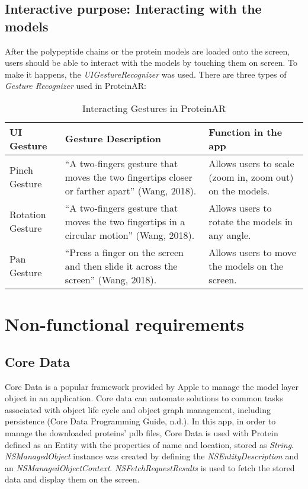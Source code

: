 \subsection{Interactive purpose: Interacting with the models}
After the polypeptide chains or the protein models are loaded onto the screen, users should be able to interact with the models by touching them on screen. To make it happens, the \emph{UIGestureRecognizer} was used. There are three types of \emph{Gesture Recognizer} used in ProteinAR:

\begin{table}[h!]
\centering
\begin{tabularx}{\textwidth} {
  | >{\raggedright\arraybackslash}X 
  | >{\raggedright\arraybackslash}X 
  | >{\raggedright\arraybackslash}X | }
\hline
UI Gesture & Gesture Description & Function in the app \\
\hline
\hline
Pinch Gesture & “A two-fingers gesture that moves the two fingertips closer or farther apart” (Wang, 2018). & Allows users to scale (zoom in, zoom out) on the models. \\
\hline
Rotation Gesture & “A two-fingers gesture that moves the two fingertips in a circular motion” (Wang, 2018). & Allows users to rotate the models in any angle. \\
\hline
Pan Gesture & “Press a finger on the screen and then slide it across the screen” (Wang, 2018). & Allows users to move the models on the screen. \\
\hline
\end{tabularx}
\caption {Interacting Gestures in ProteinAR}
\label{tab:gesture}
\end{table}



\section{Non-functional requirements}
\subsection{Core Data}
Core Data is a popular framework provided by Apple to manage the model layer object in an application. Core data can automate solutions to common tasks associated with object life cycle and object graph management, including persistence (Core Data Programming Guide, n.d.). In this app, in order to manage the downloaded proteins’ pdb files, Core Data is used with Protein defined as an Entity with the properties of name and location, stored as \emph{String}. \emph{NSManagedObject} instance was created by defining the \emph{NSEntityDescription} and an \emph{NSManagedObjectContext}. \emph{NSFetchRequestResults} is used to fetch the stored data and display them on the screen. 

